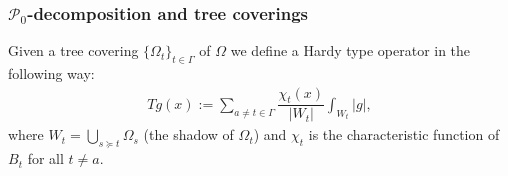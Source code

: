 \documentclass[small,xcolor=svgnames]{beamer}
\def\O{\Omega}
\def\P{\mathcal{P}}
\def\c{\color{blue}}
\begin{document}




\begin{frame}\frametitle{$\P_0$-decomposition and tree coverings}

Given a tree covering $\{\O_t\}_{t\in\Gamma}$ of $\O$ we define a {\c Hardy type operator} in the following way:
\begin{eqnarray*}
Tg(x):=\sum_{a\neq t\in\Gamma}\dfrac{\chi_{t}(x)}{|W_t|}\int_{W_t}|g|,
\end{eqnarray*} 
where $\displaystyle{W_t=\bigcup_{s\succeq t} \O_s}$ ({\c the shadow of $\O_t$}) and $\chi_t$ is the characteristic function of $B_t$ for all $t\neq a$. 


\end{frame}
\end{document}
